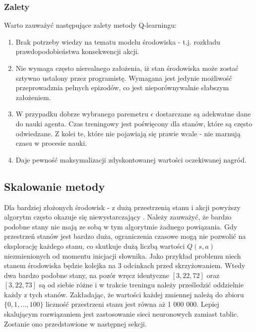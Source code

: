 \documentclass[12pt]{book}
\theoremstyle{plain}
\begin{document}
\subsubsection{Zalety} 
Warto zauważyć następujące zalety metody Q-learningu:
\begin{enumerate}
	\item Brak potrzeby wiedzy na tematu modelu środowiska - t.j. rozkładu prawdopodobieństwa konsekwencji akcji.
	\item Nie wymaga często nierealnego założenia, iż stan środowiska może zostać sztywno ustalony przez programistę. Wymagana jest jedynie możliwość przeprowadznia pełnych epizodów, co jest nieporównywalnie słabszym założeniem.
	\item W przypadku dobrze wybranego paremetru $\epsilon$ dostarczane są adekwatne dane do nauki agenta. Czas treningowy jest poświęcony dla stanów, które są często odwiedzane. Z kolei te, które nie pojawiają się prawie wcale - nie marnują czasu w procesie nauki.
	\item Daje pewność maksymalizacji zdyskontowanej wartości oczekiwanej nagród.
\end{enumerate}
\subsection*{Skalowanie metody}
Dla bardziej złożonych środowisk - z dużą przestrzenią stanu i akcji powyższy algorytm często okazuje się niewystarczający \cite{q_zlozony_env}. Należy zauważyć, że bardzo podobne stany nie mają ze sobą w tym algorytmie żadnego powiązania. Gdy przestrzeń stanów jest bardzo duża, ograniczenia czasowe mogą nie pozwolić na eksplorację każdego stanu, co skutkuje dużą liczbą wartości $Q(s,a)$ niezmienionych od momentu inicjacji słownika. Jako przykład problemu niech stanem środowiska będzie kolejka na 3 odcinkach przed skrzyżowaniem. Wtedy dwa bardzo podobne stany, na pozór wręcz identyczne $[3,22,72]$ oraz $[3,22,73]$ są od siebie różne i w trakcie treningu należy prześledzić oddzielnie każdy z tych stanów. Zakładając, że wartości każdej zmiennej należą do zbioru $\{0,1,...,100\}$ liczność przestrzeni stanu jest równa aż 1 000 000. Lepiej skalującym rozwiązaniem jest zastosowanie sieci neuronowych zamiast tablic. Zostanie ono przedstawione w następnej sekcji.
\end{document}
